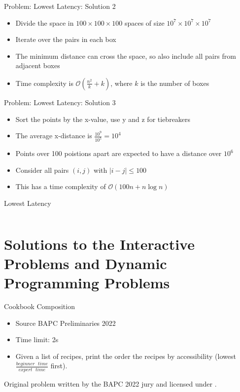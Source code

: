 \documentclass[11pt,pdf, aspectratio=169]{beamer}
\begin{document}
  \begin{frame}{Problem: Lowest Latency: Solution 2}
    \begin{itemize}
      \item Divide the space in $100\times 100 \times 100$ spaces of size $10^7 \times 10^7 \times 10^7$
      \item Iterate over the pairs in each box
      \item The minimum distance can cross the space, so also include all pairs from adjacent boxes
      \item Time complexity is $\mathcal{O}\left(\frac{n^2}{k} + k\right)$, where $k$ is the number of boxes
    \end{itemize}
  \end{frame}
  \begin{frame}{Problem: Lowest Latency: Solution 3}
    \begin{itemize}
      \item Sort the points by the x-value, use y and z for tiebreakers
      \item The average x-distance is $\frac{10^9}{10^5} = 10^4$
      \item Points over 100 poistions apart are expected to have a distance over $10^6$
      \item Consider all pairs $(i, j)$ with $|i-j| \leq 100$
      \item This has a time complexity of $\mathcal{O}(100n + n \log n)$
    \end{itemize}
  \end{frame}
  \begin{frame}[containsverbatim]{Lowest Latency}
    \inputminted{python}{code/session-4/bapc-l.py}
  \end{frame}


  \section{Solutions to the Interactive Problems and Dynamic Programming Problems}
  \begin{frame}{Cookbook Composition}
    \begin{itemize}
      \item Source BAPC Preliminaries 2022
      \item Time limit: 2s
      \item Given a list of recipes, print the order the recipes by accessibility (lowest $\frac{beginner\text{ }time}{expert\text{ }time}$ first).

    \end{itemize}
    Original problem written by the BAPC 2022 jury and licensed under \doclicenseLongNameRef.

    \doclicenseImage
  \end{frame}
\end{document}
